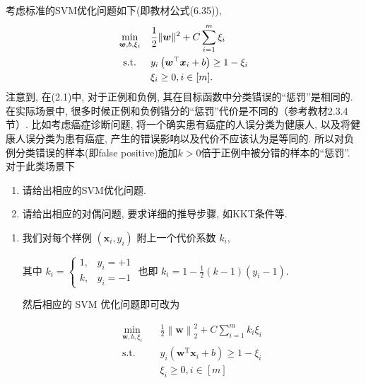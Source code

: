 \documentclass[answers]{exam}  %
\begin{document}
\begin{questions}
  考虑标准的SVM优化问题如下(即教材公式(6.35)),
  \begin{equation}
    \begin{aligned}
      \min _{\boldsymbol{w}, b, \xi_{i}} \quad & \frac{1}{2}\|\boldsymbol{w}\|^{2}+C \sum_{i=1}^{m} \xi_{i}     \\
      \text { s.t. } \quad          & y_{i}\left(\boldsymbol{w}^\top {\boldsymbol{x}}_{i}+b\right) \geq 1-\xi_{i} \\
                                    & \xi_{i} \geq 0, i\in [m] .
    \end{aligned}
  \end{equation}
  注意到, 在(2.1)中, 对于正例和负例, 其在目标函数中分类错误的“惩罚”是相同的. 在实际场景中, 很多时候正例和负例错分的“惩罚”代价是不同的（参考教材2.3.4节）. 比如考虑癌症诊断问题, 将一个确实患有癌症的人误分类为健康人, 以及将健康人误分类为患有癌症, 产生的错误影响以及代价不应该认为是等同的. 所以对负例分类错误的样本(即false positive)施加$k>0$倍于正例中被分错的样本的“惩罚”. 对于此类场景下
  \begin{enumerate}
    \item 请给出相应的SVM优化问题.
    \item 请给出相应的对偶问题, 要求详细的推导步骤, 如KKT条件等.
  \end{enumerate}

  \begin{solution}
    \begin{enumerate}
      \item

            我们对每个样例 $(\bm{x}_i, y_i)$ 附上一个代价系数 $k_i$,

            其中 $\displaystyle k_i = \begin{cases} 1, & y_i = +1 \\ k, & y_i = -1 \end{cases}$ 也即 $\displaystyle k_i = 1 - \frac{1}{2}(k - 1)(y_i - 1)$.

            然后相应的 SVM 优化问题即可改为

            $$
              \begin{aligned}
                \min_{\bm{w}, b, \xi_i} & \quad \frac{1}{2}\left\| \bm{w} \right\|_{2}^{2} + C\sum_{i=1}^{m}k_i\xi_i \\
                \text{s.t.}
                                        & \quad y_i(\bm{w}^{\mathrm{T}}\bm{x}_i + b) \ge 1 - \xi_i                   \\
                                        & \quad \xi_i \ge 0, i \in [m]                                               \\
              \end{aligned}
            $$


\end{enumerate}
\end{solution}
\end{questions}
\end{document}
